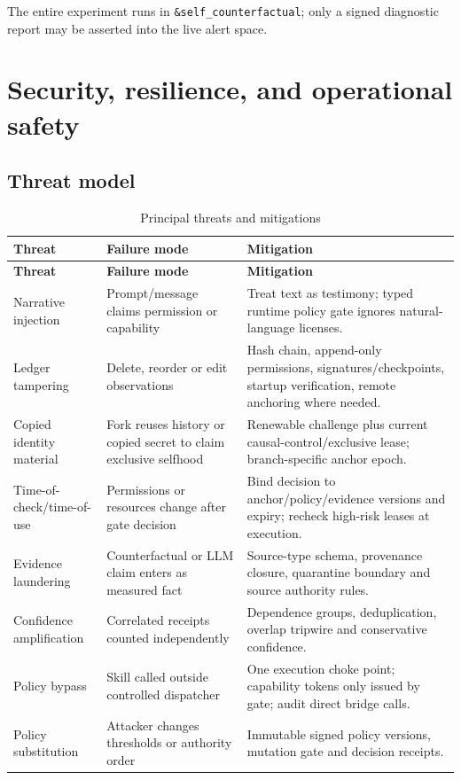 \documentclass[11pt,oneside]{report}
\begin{document}
The entire experiment runs in \texttt{\&self\_counterfactual}; only a signed diagnostic report may be asserted into the live alert space.

\chapter{Security, resilience, and operational safety}

\section{Threat model}

\begin{longtable}{@{}L{1.40in}L{2.20in}L{2.85in}@{}}
\caption{Principal threats and mitigations}\label{tab:threats}\\
\toprule
\textbf{Threat} & \textbf{Failure mode} & \textbf{Mitigation} \\
\midrule
\endfirsthead
\toprule
\textbf{Threat} & \textbf{Failure mode} & \textbf{Mitigation} \\
\midrule
\endhead
Narrative injection & Prompt/message claims permission or capability & Treat text as testimony; typed runtime policy gate ignores natural-language licenses. \\
Ledger tampering & Delete, reorder or edit observations & Hash chain, append-only permissions, signatures/checkpoints, startup verification, remote anchoring where needed. \\
Copied identity material & Fork reuses history or copied secret to claim exclusive selfhood & Renewable challenge plus current causal-control/exclusive lease; branch-specific anchor epoch. \\
Time-of-check/time-of-use & Permissions or resources change after gate decision & Bind decision to anchor/policy/evidence versions and expiry; recheck high-risk leases at execution. \\
Evidence laundering & Counterfactual or LLM claim enters as measured fact & Source-type schema, provenance closure, quarantine boundary and source authority rules. \\
Confidence amplification & Correlated receipts counted independently & Dependence groups, deduplication, overlap tripwire and conservative confidence. \\
Policy bypass & Skill called outside controlled dispatcher & One execution choke point; capability tokens only issued by gate; audit direct bridge calls. \\
Policy substitution & Attacker changes thresholds or authority order & Immutable signed policy versions, mutation gate and decision receipts. \\

\end{longtable}
\end{document}
